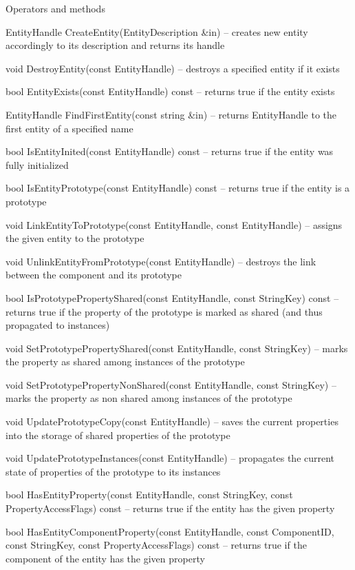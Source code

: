 \documentclass[12pt, a4paper]{article}
\newenvironment{titled-itemize}[1]
{
\vspace{5mm}
\noindent\textbf{#1}
\begin{itemize}
}
{
\end{itemize}
}
\begin{document}
\begin{titled-itemize}{Operators and methods}
  \item EntityHandle CreateEntity(EntityDescription \&in) -- creates new entity accordingly to its description and returns its handle
  \item void DestroyEntity(const EntityHandle) -- destroys a specified entity if it exists
  \item bool EntityExists(const EntityHandle) const -- returns true if the entity exists
  \item EntityHandle FindFirstEntity(const string \&in) -- returns EntityHandle to the first entity of a specified name
  \item bool IsEntityInited(const EntityHandle) const -- returns true if the entity was fully initialized
  \item bool IsEntityPrototype(const EntityHandle) const -- returns true if the entity is a prototype
  \item void LinkEntityToPrototype(const EntityHandle, const EntityHandle) -- assigns the given entity to the prototype
  \item void UnlinkEntityFromPrototype(const EntityHandle) -- destroys the link between the component and its prototype
  \item bool IsPrototypePropertyShared(const EntityHandle, const String\-Key) const -- returns true if the property of the prototype is marked as shared (and thus propagated to instances)
  \item void SetPrototypePropertyShared(const EntityHandle, const String\-Key) -- marks the property as shared among instances of the prototype
  \item void SetPrototypePropertyNonShared(const EntityHandle, const String\-Key) -- marks the property as non shared among instances of the prototype
  \item void UpdatePrototypeCopy(const EntityHandle) -- saves the current properties into the storage of shared properties of the prototype
  \item void UpdatePrototypeInstances(const EntityHandle) -- propagates the current state of properties of the prototype to its instances
  \item bool HasEntityProperty(const EntityHandle, const StringKey, const PropertyAccessFlags) const -- returns true if the entity has the given property
  \item bool HasEntityComponentProperty(const EntityHandle, const ComponentID, const StringKey, const PropertyAccessFlags) const -- returns true if the component of the entity has the given property

\end{titled-itemize}
\end{document}

